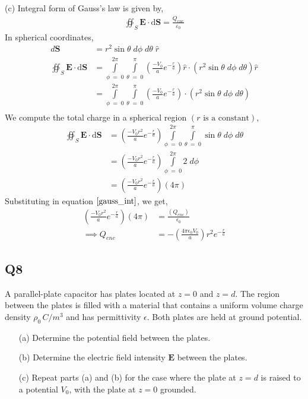 \documentclass[12pt]{article}
\providecommand{\brak}[1]{\ensuremath{\left(#1\right)}}
\begin{document}
(c) Integral form of Gauss's law is given by,
\begin{align}
    \oiint_S \mathbf{E} \cdot \mathrm{d}\mathbf{S} = \frac{Q_{enc}}{\varepsilon_0} \label{gauss_int}
\end{align}
In spherical coordinates,
\begin{align*}
    d\mathbf{S} &= r^2 \sin{\theta} \;d\phi \;d\theta \;\hat{r}\\
    \oiint_S \mathbf{E} \cdot \mathrm{d}\mathbf{S} &= \int\limits_{\phi \;=\; 0}^{2\pi} \int\limits_{\theta \;=\; 0}^{\pi} \brak{\frac{-V_0}{a} e^{-\frac{r}{a}}} \hat{r} \cdot \brak{r^2 \sin{\theta} \;d\phi \;d\theta} \hat{r}\\
    &= \int\limits_{\phi \;=\; 0}^{2\pi} \int\limits_{\theta \;=\; 0}^{\pi} \brak{\frac{-V_0}{a} e^{-\frac{r}{a}}} \cdot \brak{r^2 \sin{\theta} \;d\phi \;d\theta} \\
\end{align*}
We compute the total charge in a spherical region \brak{r \text{ is a constant}},
\begin{align*}
    \oiint_S \mathbf{E} \cdot \mathrm{d}\mathbf{S} &= \brak{\frac{-V_0 r^2}{a} e^{-\frac{r}{a}}} \int\limits_{\phi \;=\; 0}^{2\pi} \int\limits_{\theta \;=\; 0}^{\pi}  \sin{\theta} \;d\phi \;d\theta \\
    &= \brak{\frac{-V_0 r^2}{a} e^{-\frac{r}{a}}} \int\limits_{\phi \;=\; 0}^{2\pi} 2\;d\phi \\
    &= \brak{\frac{-V_0 r^2}{a} e^{-\frac{r}{a}}} \brak{4\pi}
\end{align*}
Substituting in equation $\ref{gauss_int}$, we get,
\begin{align*}
    \brak{\frac{-V_0 r^2}{a} e^{-\frac{r}{a}}} \brak{4\pi} &= \frac{\brak{Q_{enc}}}{\epsilon_0}\\
    \implies Q_{enc} &= -\brak{\frac{4\pi\epsilon_0 V_0}{a}} r^2 e^{-\frac{r}{a}}
\end{align*}

\subsection*{Q8}
A parallel-plate capacitor has plates located at $z = 0$ and $z = d$. The region between the plates is filled with a material that contains a uniform volume charge density $\rho_0 \, C/m^3$ and has permittivity $\epsilon$. Both plates are held at ground potential.
\begin{enumerate}
    \item[(a)] Determine the potential field between the plates.
    \item[(b)] Determine the electric field intensity $\mathbf{E}$ between the plates.
    \item[(c)] Repeat parts (a) and (b) for the case where the plate at $z = d$ is raised to a potential $V_0$, with the plate at $z = 0$ grounded.
\end{enumerate}
\end{document}
